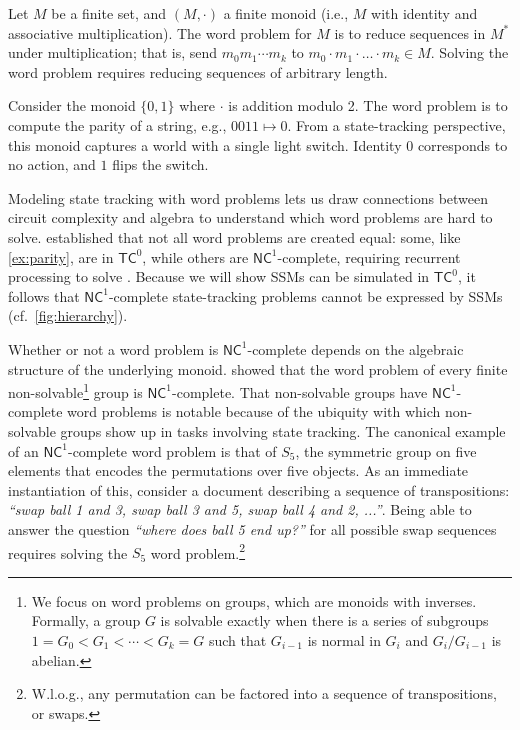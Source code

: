 \begin{definition} Let $M$ be a finite set, and $(M,\cdot)$ a finite monoid (i.e., $M$ with identity and associative multiplication). The word problem for $M$ is to reduce sequences in $M^*$ under multiplication; that is, send $m_0 m_1 \cdots m_k$ to $m_0 \cdot m_1 \cdot \ldots \cdot m_k \in M$. Solving the word problem requires reducing sequences of arbitrary length.
\end{definition}

\begin{example} \label{ex:parity}
Consider the monoid $\{0, 1\}$ where $\cdot$ is addition modulo 2. The word problem is to compute the parity of a string, e.g., $0011 \mapsto 0$. From a state-tracking perspective, this monoid captures a world with a single light switch. Identity $0$ corresponds to no action, and $1$ flips the switch.
\end{example}

Modeling state tracking with word problems lets us draw connections between circuit complexity and algebra to understand which word problems are hard to solve. \citet{krohn1965algebraic} established that not all word problems are created equal: some, like \ref{ex:parity}, are in $\mathsf{TC}^0$, while others are $\mathsf{NC}^1$-complete, requiring recurrent processing to solve \citep{immerman1989complexity,barrington1989bounded}. Because we will show SSMs can be simulated in $\mathsf{TC}^0$, it follows that $\mathsf{NC}^1$-complete state-tracking problems cannot be expressed by SSMs (cf.~\ref{fig:hierarchy}).

Whether or not a word problem is $\mathsf{NC}^1$-complete depends on the algebraic structure of the underlying monoid. \citet{barrington1989bounded} showed that the word problem of every finite non-solvable\footnote{We focus on word problems on groups, which are monoids with inverses. Formally, a group $G$ is solvable exactly when there is a series of subgroups $1 = G_0 < G_1 < \cdots < G_k = G$ such that $G_{i-1}$ is normal in $G_i$ and $G_i/G_{i-1}$ is abelian.} group is  $\mathsf{NC}^1$-complete. That non-solvable groups have $\mathsf{NC}^1$-complete word problems is notable because of the ubiquity with which non-solvable groups show up in tasks involving state tracking. The canonical example of an $\mathsf{NC}^1$-complete word problem is that of $S_5$, the symmetric group on five elements that encodes the permutations over five objects. As an immediate instantiation of this, consider a document describing a sequence of transpositions: \emph{``swap ball 1 and 3, swap ball 3 and 5, swap ball 4 and 2, ...''}. Being able to answer the question \emph{``where does ball 5 end up?''} for all possible swap sequences requires solving the $S_5$ word problem.\footnote{W.l.o.g., any permutation can be factored into a sequence of transpositions, or swaps.} 

